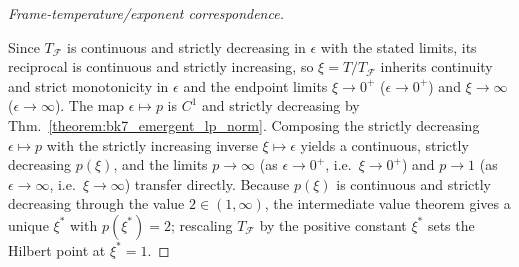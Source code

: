 \begin{proof}[Frame-temperature/exponent correspondence]
\label{proof:bk7_frame_temperature_exponent_correspondence}
\leavevmode

Since $T_{\mathcal{F}}$ is continuous and strictly decreasing in $\epsilon$ with
the stated limits, its reciprocal is continuous and strictly increasing, so
$\xi=T/T_{\mathcal{F}}$ inherits continuity and strict monotonicity in $\epsilon$
and the endpoint limits $\xi\to 0^{+}$ ($\epsilon\to 0^{+}$) and $\xi\to\infty$
($\epsilon\to\infty$). The map $\epsilon\mapsto p$ is $C^{1}$ and strictly
decreasing by Thm.~\ref{theorem:bk7_emergent_lp_norm}. Composing the strictly
decreasing $\epsilon\mapsto p$ with the strictly increasing inverse
$\xi\mapsto\epsilon$ yields a continuous, strictly decreasing $p(\xi)$, and the
limits $p\to\infty$ (as $\epsilon\to 0^{+}$, i.e.\ $\xi\to 0^{+}$) and $p\to 1$
(as $\epsilon\to\infty$, i.e.\ $\xi\to\infty$) transfer directly. Because $p(\xi)$
is continuous and strictly decreasing through the value $2\in(1,\infty)$, the
intermediate value theorem gives a unique $\xi^{\ast}$ with $p(\xi^{\ast})=2$;
rescaling $T_{\mathcal{F}}$ by the positive constant $\xi^{\ast}$ sets the Hilbert
point at $\xi^{\ast}=1$.
\end{proof}

